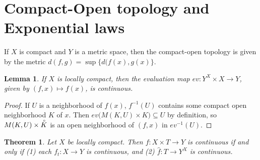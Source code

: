 \documentclass[12pt]{article}
\theoremstyle{plain}
\newtheorem{theorem}[equation]{Theorem}
\newtheorem{lemma}[equation]{Lemma}
\theoremstyle{definition}
\theoremstyle{remark}
\newcommand{\inn}[1]{\accentset{\circ}{#1}}
\begin{document}
 \section{Compact-Open topology and Exponential laws}
 If $X$ is compact and $Y$ is a metric space, then the compact-open topology is given by
 the metric $d(f,g)=\sup \{d(f(x),g(x)\}$.
 \begin{lemma}\label{L:locmptEvcont}
   If $X$ is locally compact, then the evaluation map $ev:Y^X\times X\to Y$, given by
   $(f,x)\mapsto f(x)$, is continuous.
 \end{lemma}
 \begin{proof}
   If $U$ is a neighborhood of $f(x)$, $f^{-1}(U)$ contains some compact open
   neighborhood $K$ of $x$. Then $ev\bigl(M(K,U)\times K\bigr)\subseteq U$ by definition,
   so $M(K,U)\times \inn K$ is an open neighborhood of $(f,x)$ in $ev^{-1}(U)$.
 \end{proof}
 \begin{theorem}
   Let $X$ be locally compact. Then $f:X\times T\to Y$ is continuous if and only if (1)
   each $f_t:X\to Y$ is continuous, and (2) $\hat f:T\to Y^X$ is continuous.
 \end{theorem}\vspace*{-\baselineskip}
\end{document}

